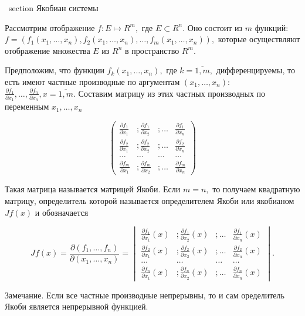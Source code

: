 \ section { Якобиан системы }
    
Рассмотрим отображение $f : E \longmapsto R^m,$ где $E \subset R^n.$ Оно состоит из $m$ функций: 
$f = \left(f_1 \left(x_1,\ldots,x_n \right),f_2 \left(x_1,\ldots,x_n \right),\ldots,f_m \left(x_1,\ldots,x_n \right) \right),$ которые осуществляют отображение множества $E$ из $R^n$ в пространство $R^m.$
    		
Предположим, что функции $f_k \left(x_1,\ldots,x_n \right),$ где $k = \overline{1,m},$ дифференцируемы, то есть имеют частные производные по аргументам $(x_1,\ldots,x_n):$
$\frac{\partial f_1}{\partial x_1},\ldots,\frac{\partial f_n}{\partial x_n}, x = \overline{1,m}.$
Составим матрицу из этих частных производных по переменным $x_1,\ldots,x_n$

$$
\begin{pmatrix} \frac{\partial f_1}{\partial x_1} &; \frac{\partial f_1}{\partial x_2} &; \ldots & \frac{\partial f_1}{\partial x_n} \\ \frac{\partial f_2}{\partial x_1} &; \frac{\partial f_2}{\partial x_2} &; \ldots & \frac{\partial f_2}{\partial x_n} \\ \ldots & \ldots & \ldots & \ldots \\ \frac{\partial f_m}{\partial x_1} &; \frac{\partial f_m}{\partial x_2} &; \ldots & \frac{\partial f_m}{\partial x_n} \end{pmatrix}
$$

Такая матрица называется матрицей Якоби.
Если $m = n,$ то получаем квадратную матрицу, определитель которой называется определителем Якоби или якобианом $Jf(x)$ и обозначается

$$
Jf(x) = \frac{\partial (f_1, \ldots, f_n)}{\partial (x_1, \dots, x_n)} = \begin{vmatrix} \frac{\partial f_1}{\partial x_1}(x) &; \frac{\partial f_1}{\partial x_2}(x) &; \ldots & \frac{\partial f_1}{\partial x_n}(x) \\ \frac{\partial f_2}{\partial x_1}(x) &; \frac{\partial f_2}{\partial x_2}(x) &; \ldots & \frac{\partial f_2}{\partial x_n}(x) \\ \dots & \dots & \dots & \dots \\ \frac{\partial f_n}{\partial x_1}(x) &; \frac{\partial f_n}{\partial x_2}(x) &; \ldots & \frac{\partial f_n}{\partial x_n}(x) \end{vmatrix}.
$$
    
Замечание. Если все частные производные непрерывны, то и сам оределитель Якоби является непрерывной функцией.